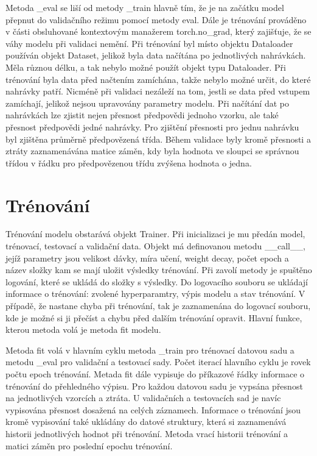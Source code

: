 \documentclass[FM,BP]{tulthesis}
\begin{document}
Metoda \_eval se liší od metody \_train hlavně tím, že je na začátku model přepnut do validačního režimu pomocí metody eval. Dále je trénování prováděno v části obsluhované kontextovým manažerem torch.no\_grad, který zajišťuje, že se váhy modelu při validaci nemění. Při trénování byl místo objektu Dataloader používán objekt Dataset, jelikož byla data načítána po jednotlivých nahrávkách. Měla různou délku, a tak nebylo možné použít objekt typu Dataloader. Při trénování byla data před načtením zamíchána, takže nebylo možné určit, do které nahrávky patří. Nicméně při validaci nezáleží na tom, jestli se data před vstupem zamíchají, jelikož nejsou upravovány parametry modelu. Při načítání dat po nahrávkách lze zjistit nejen přesnost předpovědi jednoho vzorku, ale také přesnost předpovědi jedné nahrávky. Pro zjištění přesnosti pro jednu nahrávku byl zjištěna průměrně předpovězená třída. Během validace byly kromě přesnosti a ztráty zaznamenávána matice záměn, kdy byla hodnota ve sloupci se správnou třídou v řádku pro předpovězenou třídu zvýšena hodnota o jedna.

\section{Trénování}
Trénování modelu obstarává objekt Trainer. Při inicializaci je mu předán model, trénovací, testovací a validační data. Objekt má definovanou metodu \_\_call\_\_, jejíž parametry jsou velikost dávky, míra učení, weight decay, počet epoch a název složky kam se mají uložit výsledky trénování. Při zavolí metody je spuštěno logování, které se ukládá do složky s výsledky. Do logovacího souboru se ukládají informace o trénování: zvolené hyperparamtry, výpis modelu a stav trénování. V případě, že nastane chyba při trénování, tak je zaznamenána do logovací souboru, kde je možné si ji přečíst a chybu před dalším trénování opravit. Hlavní funkce, kterou metoda volá je metoda fit modelu.

Metoda fit volá v hlavním cyklu metoda \_train pro trénovací datovou sadu a metodu \_eval pro validační a testovací sady. Počet iterací hlavního cyklu je rovek počtu epoch trénování. Metada fit dále vypisuje do příkazové řádky informace o trénování do přehledného výpisu. Pro každou datovou sadu je vypsána přesnost na jednotlivých vzorcích a ztráta. U validačních a testovacích sad je navíc vypisována přesnost dosažená na celých záznamech. Informace o trénování jsou kromě vypisování také ukládány do datové struktury, která si zaznamenává historii jednotlivých hodnot při trénování. Metoda vrací historii trénování a matici záměn pro poslední epochu trénování.
\end{document}
